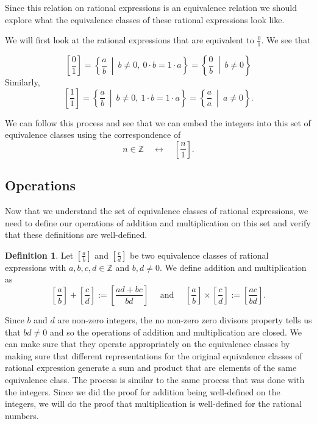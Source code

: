 \documentclass[
]{book}
\theoremstyle{definition}
\newtheorem{definition}{Definition}[chapter]
\theoremstyle{definition}
\theoremstyle{definition}
\theoremstyle{definition}
\theoremstyle{remark}
\begin{document}
Since this relation on rational expressions is an equivalence relation we should explore what the equivalence classes of these rational expressions look like.

We will first look at the rational expressions that are equivalent to \(\frac{0}{1}\). We see that

\[\left[\frac{0}{1}\right] = \left\{ \frac{a}{b} \: \middle \vert \: b\neq 0, \: 0\cdot b=1\cdot a\right\} = \left\{\frac{0}{b} \: \middle \vert \: b \neq 0 \right\}\]
Similarly,
\[\left[ \frac{1}{1}\right] = \left\{ \frac{a}{b} \: \middle \vert \: b\neq 0, \: 1\cdot b = 1 \cdot a\right\} = \left\{ \frac{a}{a} \: \middle \vert \: a \neq 0\right\}.\]

We can follow this process and see that we can embed the integers into this set of equivalence classes using the correspondence of
\[ n\in \mathbb{Z} \quad \leftrightarrow \quad \left[\frac{n}{1} \right] .\]

\hypertarget{operations}{%
\subsection{Operations}\label{operations}}

Now that we understand the set of equivalence classes of rational expressions, we need to define our operations of addition and multiplication on this set and verify that these definitions are well-defined.

\begin{definition}
Let \(\left[\frac{a}{b}\right]\) and \(\left[\frac{c}{d}\right]\) be two equivalence classes of rational expressions with \(a,b,c,d\in \mathbb{Z}\) and \(b,d\neq 0\). We define addition and multiplication as
\[\left[\frac{a}{b}\right] + \left[\frac{c}{d}\right] := \left[\frac{ad+bc}{bd}\right] \quad \mbox{ and } \quad \left[\frac{a}{b}\right] \times \left[\frac{c}{d}\right] := \left[ \frac{ac}{bd} \right].\]
\end{definition}

Since \(b\) and \(d\) are non-zero integers, the no non-zero zero divisors property tells us that \(bd\neq 0\) and so the operations of addition and multiplication are closed. We can make sure that they operate appropriately on the equivalence classes by making sure that different representations for the original equivalence classes of rational expression generate a sum and product that are elements of the same equivalence class. The process is similar to the same process that was done with the integers. Since we did the proof for addition being well-defined on the integers, we will do the proof that multiplication is well-defined for the rational numbers.
\end{document}
